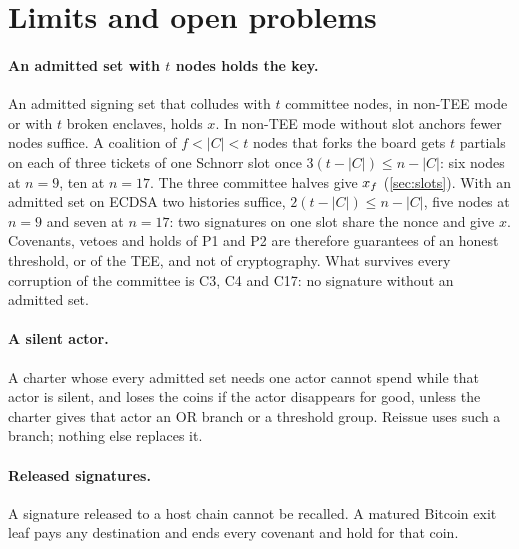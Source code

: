 \section{Limits and open problems}\label{sec:limits}

\paragraph{An admitted set with $t$ nodes holds the key.} An admitted signing set that colludes with $t$ committee nodes, in non-TEE mode or with $t$ broken enclaves, holds $x$. In non-TEE mode without slot anchors fewer nodes suffice. A coalition of $f < |C| < t$ nodes that forks the board gets $t$ partials on each of three tickets of one Schnorr slot once $3(t - |C|) \le n - |C|$: six nodes at $n = 9$, ten at $n = 17$. The three committee halves give $x_{f}$ (\cref{sec:slots}). With an admitted set on ECDSA two histories suffice, $2(t - |C|) \le n - |C|$, five nodes at $n = 9$ and seven at $n = 17$: two signatures on one slot share the nonce and give $x$. Covenants, vetoes and holds of P1 and P2 are therefore guarantees of an honest threshold, or of the TEE, and not of cryptography. What survives every corruption of the committee is C3, C4 and C17: no signature without an admitted set.

\paragraph{A silent actor.} A charter whose every admitted set needs one actor cannot spend while that actor is silent, and loses the coins if the actor disappears for good, unless the charter gives that actor an OR branch or a threshold group. Reissue uses such a branch; nothing else replaces it.

\paragraph{Released signatures.} A signature released to a host chain cannot be recalled. A matured Bitcoin exit leaf pays any destination and ends every covenant and hold for that coin.

